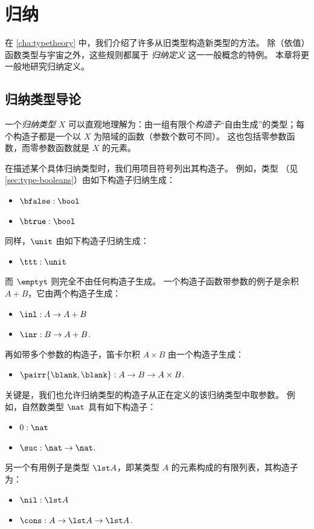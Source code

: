 \chapter{归纳}
\label{cha:induction}

在 \cref{cha:typetheory} 中，我们介绍了许多从旧类型构造新类型的方法。
除（依值）函数类型与宇宙之外，这些规则都属于 \emph{归纳定义} 这一一般概念的特例。
本章将更一般地研究归纳定义。
\section{归纳类型导论}
\label{sec:bool-nat}

%
一个\emph{归纳类型} $X$ 可以直观地理解为：由一组有限个\emph{构造子}“自由生成”的类型；每个构造子都是一个以 $X$ 为陪域的函数（参数个数可不同）。
这也包括零参数函数，而零参数函数就是 $X$ 的元素。

在描述某个具体归纳类型时，我们用项目符号列出其构造子。
例如，类型 \bool（见 \cref{sec:type-booleans}）由如下构造子归纳生成：
\begin{itemize}
\item $\bfalse:\bool$
\item $\btrue:\bool$
\end{itemize}
同样，$\unit$ 由如下构造子归纳生成：
\begin{itemize}
\item $\ttt:\unit$
\end{itemize}
而 $\emptyt$ 则完全不由任何构造子生成。
一个构造子函数带参数的例子是余积 $A+B$，它由两个构造子生成：
\begin{itemize}
\item $\inl:A\to A+B$
\item $\inr:B\to A+B$.
\end{itemize}
再如带多个参数的构造子，笛卡尔积 $A\times B$ 由一个构造子生成：
\begin{itemize}
\item $\pairr{\blank, \blank} : A\to B \to A\times B$.
\end{itemize}
关键是，我们也允许归纳类型的构造子从正在定义的该归纳类型中取参数。
例如，自然数类型 $\nat$ 具有如下构造子：
\begin{itemize}
\item $0:\nat$
\item $\suc:\nat\to\nat$.
\end{itemize}
%
%
另一个有用例子是类型 $\lst A$，即某类型 $A$ 的元素构成的有限列表，其构造子为：
\begin{itemize}\label{list_constructors}
\item $\nil:\lst A$
\item $\cons:A\to \lst A \to \lst A$.
\end{itemize}

